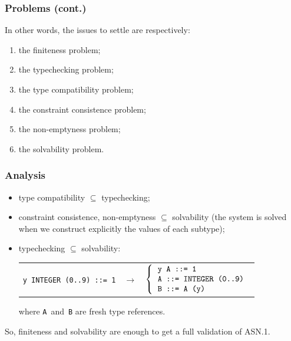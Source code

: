 \documentclass[compress,dvips,xcolor={dvipsnames},t]{beamer}
\newcommand\ASN{\textsf{ASN.1}\xspace}
\begin{document}
\begin{frame}
\frametitle{Problems (cont.)}

In other words, the issues to settle are respectively:

\begin{enumerate}

  \item the finiteness problem;

  \item the typechecking problem;

  \item the type compatibility problem;

  \item the constraint consistence problem;

  \item the non-emptyness problem;

  \item the solvability problem.

\end{enumerate}

\end{frame}

\begin{frame}
\frametitle{Analysis}

\begin{itemize}

  \item type compatibility $\subseteq$ typechecking;

  \item constraint consistence, non-emptyness $\subseteq$ solvability
        (the system is solved when we construct explicitly the values
        of each subtype);

  \item typechecking $\subseteq$ solvability:
\begin{tabular}{@{}rcl@{}}
   \texttt{y INTEGER (0..9) ::= 1}
   & $\rightarrow$
   & $\left\{
       \begin{tabular}{l}
           \texttt{y A ::= 1} \\
           \texttt{A ::= INTEGER (0..9)} \\
           \texttt{B ::= A (y)}
        \end{tabular}
     \right.$
\end{tabular}
where \texttt{A}~and~\texttt{B} are fresh type references.

\end{itemize}

So, finiteness and solvability are enough to get a full validation of
\ASN.

\end{frame}
\end{document}
